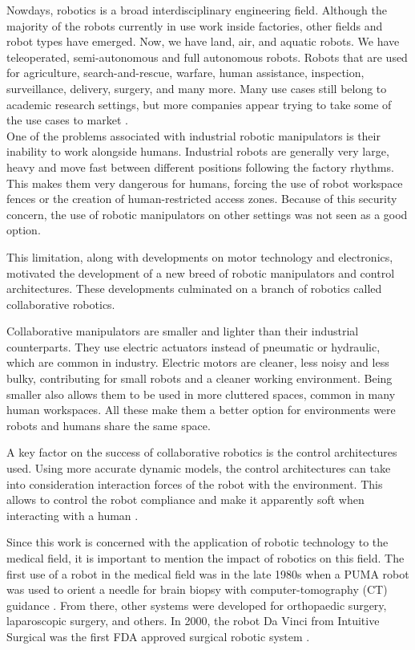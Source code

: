 Nowdays, robotics is a broad interdisciplinary engineering field. Although the majority of the robots currently in use work inside factories, other fields and robot types have emerged. Now, we have land, air, and aquatic robots. We have teleoperated, semi-autonomous and full autonomous robots. Robots that are used for agriculture, search-and-rescue, warfare, human assistance, inspection, surveillance, delivery, surgery, and many more. Many use cases still belong to academic research settings, but more companies appear trying to take some of the use cases to market \cite{MassageRobotics_new_massage_robot, AgilityRobotics_digit}.\\

One of the problems associated with industrial robotic manipulators is their inability to work alongside humans. Industrial robots are generally very large, heavy and move fast between different positions following the factory rhythms. This makes them very dangerous for humans, forcing the use of robot workspace fences or the creation of human-restricted access zones. Because of this security concern, the use of robotic manipulators on other settings was not seen as a good option.

This limitation, along with developments on motor technology and electronics, motivated the development of a new breed of robotic manipulators and control architectures. These developments culminated on a branch of robotics called collaborative robotics. 

Collaborative manipulators are smaller and lighter than their industrial counterparts. They use electric actuators instead of pneumatic or hydraulic, which are common in industry. Electric motors are cleaner, less noisy and less bulky, contributing for small robots and a cleaner working environment. Being smaller also allows them to be used in more cluttered spaces, common in many human workspaces. All these make them a better option for environments were robots and humans share the same space.

A key factor on the success of collaborative robotics is the control architectures used. Using more accurate dynamic models, the control architectures can take into consideration interaction forces of the robot with the environment. This allows to control the robot compliance and make it apparently soft when interacting with a human \cite{Bloss2016_collaborative_robotics_improvements}.

Since this work is concerned with the application of robotic technology to the medical field, it is important to mention the impact of robotics on this field. The first use of a robot in the medical field was in the late 1980s when a PUMA robot was used to orient a needle for brain biopsy with computer-tomography (CT) guidance \cite{Kwoh1988_puma_brain_surgery}. From there, other systems were developed for orthopaedic surgery, laparoscopic surgery, and others. In 2000, the robot Da Vinci from Intuitive Surgical was the first FDA approved surgical robotic system \cite{FoodAndDrugAdministration2000_fda_approves_davinci}.

